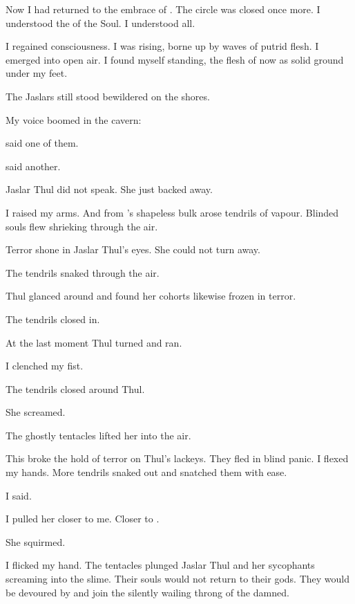 \documentclass
  [a4paper,
   12pt,
   oneside
  ]%
  {article}
\begin{document}
Now I had returned to the embrace of \Ubloth. 
The circle was closed once more. 
I understood the \Arcanum of the Soul. 
I understood all. 

I regained consciousness. 
I was rising, borne up by waves of putrid flesh.
I emerged into open air.
I found myself standing, the flesh of \Ubloth now as solid ground under my feet. 

The Jaslars still stood bewildered on the shores.

My voice boomed in the cavern:

 said one of them.

 said another.

Jaslar Thul did not speak. 
She just backed away.

I raised my arms. 
And from \Ubloth's shapeless bulk arose tendrils of vapour. 
Blinded souls flew shrieking through the air.

Terror shone in Jaslar Thul's eyes. 
She could not turn away. 

The tendrils snaked through the air. 

Thul glanced around and found her cohorts likewise frozen in terror. 

The tendrils closed in. 

At the last moment Thul turned and ran. 

I clenched my fist. 

The tendrils closed around Thul. 

She screamed. 

The ghostly tentacles lifted her into the air. 

This broke the hold of terror on Thul's lackeys. 
They fled in blind panic. 
I flexed my hands.
More tendrils snaked out and snatched them with ease. 

 I said.

I pulled her closer to me.
Closer to \Ubloth.

She squirmed. 


I flicked my hand.
The tentacles plunged Jaslar Thul and her sycophants screaming into the slime. 
Their souls would not return to their gods.
They would be devoured by \Ubloth and join the silently wailing throng of the damned. 
\end{document}
